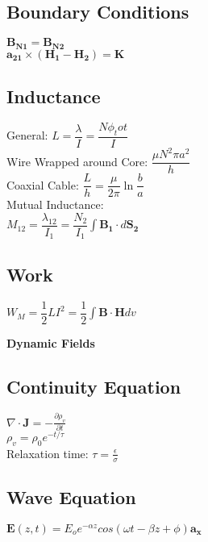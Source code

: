 \documentclass[12pt]{exam}
\begin{document}
\begin{multicols}{2}
\begin{flushleft}
	\subsection*{Boundary Conditions}\vspace{0.1in}
	{ \addtolength{\leftskip}{0.5in}
		$ \mathbf{B_{N1}} = \mathbf{B_{N2}} $ \\[4 pt]
		$ \mathbf{a_{21}}\times(\mathbf{H_1-H_2}) = \mathbf{K} $ \\[4 pt]
	}

	\subsection*{Inductance} \vspace{0.1in}
	{ \addtolength{\leftskip}{0.5in}
		General: \quad$ L = \dfrac{\lambda}{I} = \dfrac{N\phi_tot}{I}$  \\[4 pt]
		Wire Wrapped around Core: \quad$\dfrac{\mu N^2\pi a^2}{h} $ \\[4 pt]
		Coaxial Cable: \quad$\dfrac{L}{h} = \dfrac{\mu}{2\pi}\ln\dfrac{b}{a} $ \\ [4 pt]
		Mutual Inductance: \\ [4 pt]
		\quad$M_{12} = \dfrac{\lambda_{12}}{I_1} = \dfrac{N_2}{I_1}\int\mathbf{B_1}\cdot d\mathbf{S_2} $ \\ [4 pt]
	}

	\subsection*{Work}\vspace{0.1in}
	{ \addtolength{\leftskip}{0.5in}
		$W_M = \dfrac{1}{2}LI^2 = \dfrac{1}{2}\int\mathbf{B}\cdot\mathbf{H}dv$ \\ 
	}
	

\newpage
\huge
\textbf{Dynamic Fields}
\normalsize
\vspace{0.2in}
\subsection*{Continuity Equation}
{ \addtolength{\leftskip}{0.5in}
	$\nabla \cdot \mathbf{J} = -\frac{\partial \rho_v}{\partial t}$ \\[6pt]
	$\rho_v = \rho_0 e^{-t/\tau}$ \\[6pt]
	Relaxation time: 	$\tau = \frac{\epsilon}{\sigma}$ \\[6pt]
}

\normalsize
\vspace{0.2in}
\subsection*{Wave Equation}
{\addtolength{\leftskip}{0.5in}
	$\mathbf{E}(z,t)=E_oe^{-\alpha z}cos(\omega t-\beta z+\phi)\mathbf{a_x} $ \\
}


\end{flushleft}
\end{multicols}
\end{document}

